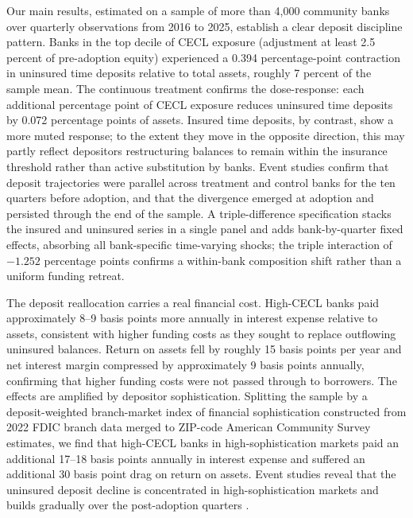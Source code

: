 Our main results, estimated on a sample of more than 4,000 community banks over
quarterly observations from 2016 to 2025, establish a clear deposit discipline
pattern.  Banks in the top decile of CECL exposure (adjustment at least 2.5
percent of pre-adoption equity) experienced a 0.394 percentage-point contraction
in uninsured time deposits relative to total assets, roughly 7 percent of the
sample mean.  The continuous treatment confirms the dose-response: each
additional percentage point of CECL exposure reduces uninsured time deposits by
0.072 percentage points of assets.  Insured time deposits, by contrast, show a
more muted response; to the extent they move in the opposite direction, this may
partly reflect depositors restructuring balances to remain within the insurance
threshold rather than active substitution by banks.  Event studies confirm that
deposit trajectories were parallel across treatment and control banks for the ten
quarters before adoption, and that the divergence emerged at adoption and
persisted through the end of the sample.  A triple-difference specification
stacks the insured and uninsured series in a single panel and adds
bank-by-quarter fixed effects, absorbing all bank-specific time-varying shocks;
the triple interaction of $-1.252$ percentage points confirms a within-bank
composition shift rather than a uniform funding retreat.

The deposit reallocation carries a real financial cost.  High-CECL banks paid
approximately 8--9 basis points more annually in interest expense relative to
assets, consistent with higher funding costs as they sought to replace outflowing
uninsured balances.  Return on assets fell by roughly 15 basis points per year
and net interest margin compressed by approximately 9 basis points annually,
confirming that higher funding costs were not passed through to borrowers.  The
effects are amplified by depositor sophistication.  Splitting the sample by a
deposit-weighted branch-market index of financial sophistication constructed from
2022 FDIC branch data merged to ZIP-code American Community Survey estimates, we
find that high-CECL banks in high-sophistication markets paid an additional
17--18 basis points annually in interest expense and suffered an additional 30
basis point drag on return on assets.  Event studies reveal that the uninsured
deposit decline is concentrated in high-sophistication markets and builds
gradually over the post-adoption quarters \citep{egan2017deposit, iyer2016tale}.

